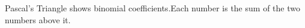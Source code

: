 \documentclass[preview]{standalone}
\begin{document}
\begin{center}
Pascal's Triangle shows binomial coefficients.Each number is the sum of the two numbers above it.
\end{center}
\end{document}
